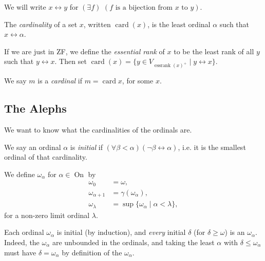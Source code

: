 \documentclass[a3paper, 10pt]{article}
\renewcommand{\vocab}[1]{\emph{#1}}
\newcommand{\card}{\operatorname{card}}
\newcommand{\on}{\operatorname{On}}
\begin{document}
\begin{multicols*}{5}
\begin{remark}[Notation]
    We will write $x \leftrightarrow y$ for $(\exists f)$ $(f \text{ is a bijection from $x$ to $y$})$.
\end{remark}

\begin{definition}[Cardinality]
  The \vocab{cardinality} of a set $x$, written $\card(x)$, is the least ordinal $\alpha$ such that $x \leftrightarrow \alpha$.
\end{definition}

\begin{remark}
  If we are just in ZF, we define the \vocab{essential rank} of $x$ to be the least rank of all $y$ such that $y \leftrightarrow x$. Then set $\card(x) = \{y \in V_{\operatorname{essrank}(x)^+} \mid y \leftrightarrow x\}$. 
\end{remark}


\begin{definition}[Cardinal]
  We say $m$ is a \vocab{cardinal} if $m = \card x$, for some $x$.
\end{definition}

\subsection{The Alephs}
We want to know what the cardinalities of the ordinals are.

\begin{definition}
  We say an ordinal $\alpha$ is \vocab{initial} if $(\forall \beta < \alpha)(\lnot \beta \leftrightarrow \alpha)$, i.e. it is the smallest ordinal of that cardinality.
\end{definition}

\begin{definition}
  We define $\omega_\alpha$ for $\alpha \in \on$ by
  \begin{align*}
    \omega_0 &= \omega, \\
    \omega_{\alpha + 1}&= \gamma(\omega_\alpha), \\
    \omega_{\lambda} &= \sup\{\omega_\alpha\mid \alpha < \lambda\},
  \end{align*}
  for a non-zero limit ordinal $\lambda$.
\end{definition}

Each ordinal $\omega_\alpha$ is initial (by induction), and \emph{every} initial $\delta$ (for $\delta \geq \omega$) is an $\omega_\alpha$. 
Indeed, the $\omega_\alpha$ are unbounded in the ordinals, and taking the least $\alpha$ with $\delta \leq \omega_\alpha$ must have $\delta = \omega_\alpha$ by definition of the $\omega_\alpha$.


\end{multicols*}
\end{document}
